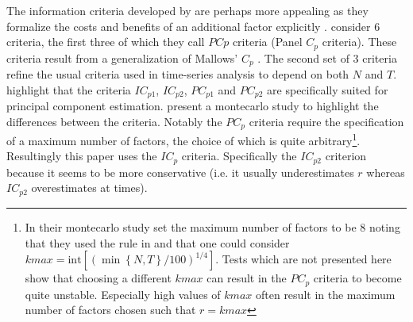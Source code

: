 \documentclass[12pt]{article}
\begin{document}
The information criteria developed by \citet{bai2002determining} are perhaps more appealing as they formalize the costs and benefits of an additional factor explicitly \citep{stock2011dynamic}. \citet{bai2002determining} consider $6$ criteria, the first three of which they call $PCp$ criteria (Panel $C_p$ criteria). These criteria result from a generalization of Mallows' $C_p$ \citep{mallows1973some}. The second set of $3$ criteria refine the usual criteria used in time-series analysis to depend on both $N$ and $T$. \citet{bai2002determining} highlight that the criteria $IC_{p1}$, $IC_{p2}$, $PC_{p1}$ and $PC_{p2}$ are specifically suited for principal component estimation. \citet{bai2002determining} present a montecarlo study to highlight the differences between the criteria. Notably the $PC_{p}$ criteria require the specification of a maximum number of factors, the choice of which is quite arbitrary\footnote{In their montecarlo study \citet{bai2002determining} set the maximum number of factors to be $8$ noting that they used the rule in \citet{schwert2002tests} and that one could consider $kmax=\text{int}[(\min\left\{N, T\right\}/100)^{1/4}]$. Tests which are not presented here show that choosing a different $kmax$ can result in the $PC_p$ criteria to become quite unstable. Especially high values of $kmax$ often result in the maximum number of factors chosen such that $r=kmax$}. Resultingly this paper uses the $IC_p$ criteria. Specifically the $IC_{p2}$ criterion because it seems to be more conservative (i.e. it usually underestimates $r$ whereas $IC_{p2}$ overestimates at times). 
\end{document}
